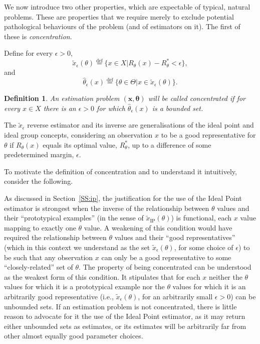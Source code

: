 \documentclass{IEEEtran}
\newcommand{\defeq}{\stackrel{\text{def}}{=}}
\newtheorem{defi}{Definition}
\begin{document}
We now introduce two other properties, which are expectable of typical,
natural problems. These are properties that we require merely to exclude
potential pathological behaviours of the problem (and of estimators on it).
The first of these is \emph{concentration}.

Define for every $\epsilon>0$,
\[
\tilde{x}_{\epsilon}(\theta)\defeq\{x\in X | R_{\theta}(x)-R^*_\theta<\epsilon\},
\]
and
\[
\hat{\theta}_{\epsilon}(x)\defeq\{\theta\in\Theta|x\in\tilde{x}_{\epsilon}(\theta)\}.
\]

\begin{defi}
An estimation problem $(\mathbf{x},\boldsymbol{\theta})$ will be called
\emph{concentrated} if for every $x \in X$ there is an $\epsilon>0$
for which $\hat{\theta}_{\epsilon}(x)$ is a bounded set.
\end{defi}

The $\tilde{x}_\epsilon$ reverse estimator and its inverse are generalisations
of the ideal point and ideal group concepts, considering an observation $x$
to be a good representative for $\theta$ if $R_\theta(x)$ equals its optimal
value, $R^*_\theta$, up to a difference of some predetermined margin,
$\epsilon$.

To motivate the definition of concentration and to understand it
intuitively, consider the following.

As discussed in Section~\ref{SS:ip}, the justification for the use of the
Ideal Point estimator is strongest when the inverse of the relationship between
$\theta$ values and their ``prototypical examples'' (in the sense of
$\tilde{x}_{\text{IP}}(\theta)$) is functional, each $x$ value mapping to
exactly one $\theta$ value. A weakening of this
condition would have required the relationship between $\theta$ values and
their ``good representatives'' (which in this context we understand as
the set $\tilde{x}_\epsilon(\theta)$, for some choice of $\epsilon$)
to be such that any observation $x$ can only
be a good representative to some ``closely-related'' set of $\theta$.
The property of being concentrated can be understood as the weakest form of
this condition.  It stipulates that
for each $x$ neither the $\theta$ values for which it is a prototypical
example nor the $\theta$ values for which it is an arbitrarily good
representative (i.e., $\tilde{x}_\epsilon(\theta)$, for an arbitrarily
small $\epsilon>0$) can be unbounded sets. If an estimation problem is not
concentrated, there is little reason to advocate for it the use of the
Ideal Point estimator, as it may return either unbounded sets as estimates,
or its estimates will be arbitrarily far from other almost equally good
parameter choices.
\end{document}
